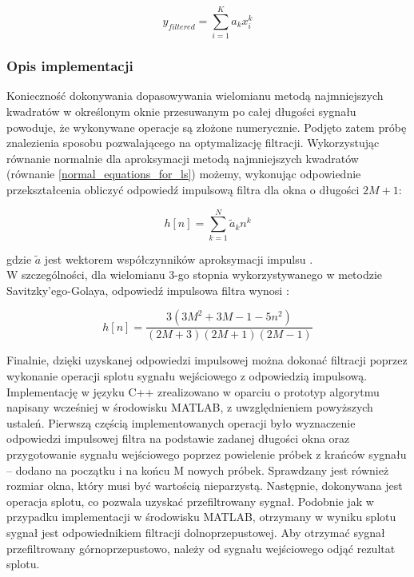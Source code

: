 \documentclass[a4paper]{article}
\begin{document}
\begin{equation}
y_{filtered} = \sum_{i=1}^K a_k x_i^k
\end{equation}

\subsubsection {Opis implementacji}

Konieczność dokonywania dopasowywania wielomianu metodą najmniejszych kwadratów w określonym oknie przesuwanym po całej długości sygnału powoduje, że wykonywane operacje są złożone numerycznie. Podjęto zatem próbę znalezienia sposobu pozwalającego na optymalizację filtracji. Wykorzystując równanie normalnie dla aproksymacji metodą najmniejszych kwadratów (równanie \ref{normal_equations_for_ls}) możemy, wykonując odpowiednie przekształcenia \cite{sg-optimization-book, sg-optimization} obliczyć odpowiedź impulsową filtra dla okna o długości $2M+1$:

\begin{equation}
h[n] = \sum_{k=1}^N \tilde{a}_k n^k
\end{equation}

gdzie $\tilde{a}$ jest wektorem współczynników aproksymacji impulsu \cite{sg-optimization}.\\

W szczególności, dla wielomianu 3-go stopnia wykorzystywanego w metodzie Savitzky'ego-Golaya, odpowiedź impulsowa filtra wynosi \cite{sg-impulse-response}:

\begin{equation}
h[n] = \frac{3(3M^2+3M-1-5n^2)}{(2M+3)(2M+1)(2M-1)}
\end{equation}

Finalnie, dzięki uzyskanej odpowiedzi impulsowej można dokonać filtracji poprzez wykonanie operacji splotu sygnału wejściowego z odpowiedzią impulsową. \\

Implementację w języku C++ zrealizowano w oparciu o prototyp algorytmu napisany wcześniej w środowisku MATLAB, z uwzględnieniem powyższych ustaleń. Pierwszą częścią implementowanych operacji było wyznaczenie odpowiedzi impulsowej filtra na podstawie zadanej długości okna oraz przygotowanie sygnału wejściowego poprzez powielenie próbek z krańców sygnału -- dodano na początku i na końcu M nowych próbek. Sprawdzany jest również rozmiar okna, który musi być wartością nieparzystą. Następnie, dokonywana jest operacja splotu, co pozwala uzyskać przefiltrowany sygnał. Podobnie jak w przypadku implementacji w środowisku MATLAB, otrzymany w wyniku splotu sygnał jest odpowiednikiem filtracji dolnoprzepustowej. Aby otrzymać sygnał przefiltrowany górnoprzepustowo, należy od sygnału wejściowego odjąć rezultat splotu.
\end{document}
